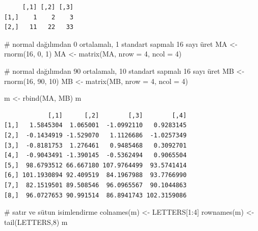 \documentclass[
  letterpaper,
  DIV=11,
  numbers=noendperiod]{scrreprt}
\newenvironment{Shaded}{\begin{snugshade}}{\end{snugshade}}
\newcommand{\AttributeTok}[1]{\textcolor[rgb]{0.40,0.45,0.13}{#1}}
\newcommand{\CommentTok}[1]{\textcolor[rgb]{0.37,0.37,0.37}{#1}}
\newcommand{\DecValTok}[1]{\textcolor[rgb]{0.68,0.00,0.00}{#1}}
\newcommand{\FunctionTok}[1]{\textcolor[rgb]{0.28,0.35,0.67}{#1}}
\newcommand{\NormalTok}[1]{\textcolor[rgb]{0.00,0.23,0.31}{#1}}
\newcommand{\OtherTok}[1]{\textcolor[rgb]{0.00,0.23,0.31}{#1}}
\newcommand{\SpecialCharTok}[1]{\textcolor[rgb]{0.37,0.37,0.37}{#1}}
\begin{document}
\begin{verbatim}
     [,1] [,2] [,3]
[1,]    1    2    3
[2,]   11   22   33
\end{verbatim}

\begin{Shaded}
\begin{Highlighting}[]
\CommentTok{\# normal dağılımdan 0 ortalamalı, 1 standart sapmalı 16 sayı üret}
\NormalTok{MA }\OtherTok{\textless{}{-}} \FunctionTok{rnorm}\NormalTok{(}\DecValTok{16}\NormalTok{, }\DecValTok{0}\NormalTok{, }\DecValTok{1}\NormalTok{)}
\NormalTok{MA }\OtherTok{\textless{}{-}} \FunctionTok{matrix}\NormalTok{(MA, }\AttributeTok{nrow =} \DecValTok{4}\NormalTok{, }\AttributeTok{ncol =} \DecValTok{4}\NormalTok{)}

\CommentTok{\# normal dağılımdan 90 ortalamalı, 10 standart sapmalı 16 sayı üret}
\NormalTok{MB }\OtherTok{\textless{}{-}} \FunctionTok{rnorm}\NormalTok{(}\DecValTok{16}\NormalTok{, }\DecValTok{90}\NormalTok{, }\DecValTok{10}\NormalTok{)}
\NormalTok{MB }\OtherTok{\textless{}{-}} \FunctionTok{matrix}\NormalTok{(MB, }\AttributeTok{nrow =} \DecValTok{4}\NormalTok{, }\AttributeTok{ncol =} \DecValTok{4}\NormalTok{)}

\NormalTok{m }\OtherTok{\textless{}{-}} \FunctionTok{rbind}\NormalTok{(MA, MB)}
\NormalTok{m}
\end{Highlighting}
\end{Shaded}

\begin{verbatim}
            [,1]      [,2]        [,3]        [,4]
[1,]   1.5845304  1.065001  -1.0992110   0.9283145
[2,]  -0.1434919 -1.529070   1.1126686  -1.0257349
[3,]  -0.8181753  1.276461   0.9485468   0.3092701
[4,]  -0.9043491 -1.390145  -0.5362494   0.9065504
[5,]  98.6793512 66.667180 107.9764499  93.5741414
[6,] 101.1930894 92.409519  84.1967988  93.7766990
[7,]  82.1519501 89.508546  96.0965567  90.1044863
[8,]  96.0727653 90.991514  86.8941743 102.3159086
\end{verbatim}

\begin{Shaded}
\begin{Highlighting}[]
\CommentTok{\# satır ve sütun isimlendirme}
\FunctionTok{colnames}\NormalTok{(m) }\OtherTok{\textless{}{-}}\NormalTok{ LETTERS[}\DecValTok{1}\SpecialCharTok{:}\DecValTok{4}\NormalTok{]}
\FunctionTok{rownames}\NormalTok{(m) }\OtherTok{\textless{}{-}} \FunctionTok{tail}\NormalTok{(LETTERS,}\DecValTok{8}\NormalTok{)}
\NormalTok{m}
\end{Highlighting}
\end{Shaded}
\end{document}
